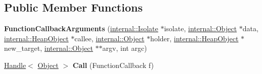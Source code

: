 \subsection*{Public Member Functions}
\begin{DoxyCompactItemize}
\item 
{\bfseries Function\+Callback\+Arguments} (\hyperlink{classv8_1_1internal_1_1_isolate}{internal\+::\+Isolate} $\ast$isolate, \hyperlink{classv8_1_1internal_1_1_object}{internal\+::\+Object} $\ast$data, \hyperlink{classv8_1_1internal_1_1_heap_object}{internal\+::\+Heap\+Object} $\ast$callee, \hyperlink{classv8_1_1internal_1_1_object}{internal\+::\+Object} $\ast$holder, \hyperlink{classv8_1_1internal_1_1_heap_object}{internal\+::\+Heap\+Object} $\ast$new\+\_\+target, \hyperlink{classv8_1_1internal_1_1_object}{internal\+::\+Object} $\ast$$\ast$argv, int argc)\hypertarget{classv8_1_1internal_1_1_function_callback_arguments_aae28c3301263d2d810ea7b6f6704c4e1}{}\label{classv8_1_1internal_1_1_function_callback_arguments_aae28c3301263d2d810ea7b6f6704c4e1}

\item 
\hyperlink{classv8_1_1internal_1_1_handle}{Handle}$<$ \hyperlink{classv8_1_1internal_1_1_object}{Object} $>$ {\bfseries Call} (Function\+Callback f)\hypertarget{classv8_1_1internal_1_1_function_callback_arguments_a7cad20e806f2e5185aff262d96e41915}{}\label{classv8_1_1internal_1_1_function_callback_arguments_a7cad20e806f2e5185aff262d96e41915}

\end{DoxyCompactItemize}
